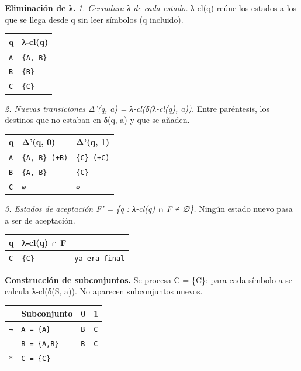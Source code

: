 \documentclass[11pt]{article}
\begin{document}
\textbf{Eliminación de λ.} \textit{1. Cerradura λ de cada estado.} λ-cl(q) reúne los estados a los que se llega desde q sin leer símbolos (q incluido).
\begin{center}\footnotesize\begin{tabular}{ll}\toprule
q & λ-cl(q) \\\midrule
\texttt{A} & \texttt{\{A, B\}} \\
\texttt{B} & \texttt{\{B\}} \\
\texttt{C} & \texttt{\{C\}} \\
\bottomrule\end{tabular}\end{center}
\textit{2. Nuevas transiciones Δ'(q, a) = λ-cl(δ(λ-cl(q), a)).} Entre paréntesis, los destinos que no estaban en δ(q, a) y que se añaden.
\begin{center}\footnotesize\begin{tabular}{lll}\toprule
q & Δ'(q, 0) & Δ'(q, 1) \\\midrule
\texttt{A} & \texttt{\{A, B\}  (+B)} & \texttt{\{C\}  (+C)} \\
\texttt{B} & \texttt{\{A, B\}} & \texttt{\{C\}} \\
\texttt{C} & \texttt{∅} & \texttt{∅} \\
\bottomrule\end{tabular}\end{center}
\textit{3. Estados de aceptación F' = \{q : λ-cl(q) ∩ F ≠ ∅\}.} Ningún estado nuevo pasa a ser de aceptación.
\begin{center}\footnotesize\begin{tabular}{lll}\toprule
q & λ-cl(q) ∩ F &  \\\midrule
\texttt{C} & \texttt{\{C\}} & \texttt{ya era final} \\
\bottomrule\end{tabular}\end{center}
\textbf{Construcción de subconjuntos.} Se procesa C = \{C\}: para cada símbolo a se calcula λ-cl(δ(S, a)). No aparecen subconjuntos nuevos.
\begin{center}\footnotesize\begin{tabular}{llll}\toprule
 & Subconjunto & 0 & 1 \\\midrule
\texttt{→} & \texttt{A = \{A\}} & \texttt{B} & \texttt{C} \\
\texttt{} & \texttt{B = \{A,B\}} & \texttt{B} & \texttt{C} \\
\texttt{*} & \texttt{C = \{C\}} & \texttt{—} & \texttt{—} \\
\bottomrule\end{tabular}\end{center}
\end{document}
